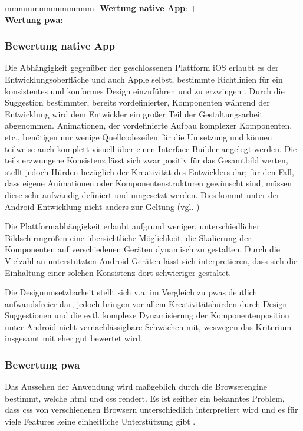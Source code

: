 \begin{tabbing}
	mmmmmmmmmmmmm				\= \kill
	\textbf{Wertung native App}: \> $+$ \\
	\textbf{Wertung \ac{pwa}}: \> $-$
\end{tabbing}

\subsubsection{Bewertung native App}
Die Abhängigkeit gegenüber der geschlossenen Plattform iOS erlaubt es der Entwicklungsoberfläche und auch Apple selbst, bestimmte Richtlinien für ein konsistentes und konformes Design einzuführen und zu erzwingen \cite{AppleDesign}. Durch die Suggestion bestimmter, bereits vordefinierter, Komponenten während der Entwicklung wird dem Entwickler ein großer Teil der Gestaltungsarbeit abgenommen. Animationen, der vordefinierte Aufbau komplexer Komponenten, etc., benötigen nur wenige Quellcodezeilen für die Umsetzung und können teilweise auch komplett visuell über einen Interface Builder angelegt werden. Die teils erzwungene Konsistenz lässt sich zwar positiv für das Gesamtbild werten, stellt jedoch Hürden bezüglich der Kreativität des Entwicklers dar; für den Fall, dass eigene Animationen oder Komponentenstrukturen gewünscht sind, müssen diese sehr aufwändig definiert und umgesetzt werden. Dies kommt unter der Android-Entwicklung nicht anders zur Geltung (vgl. \cite{AndroidDesign})

Die Plattformabhängigkeit erlaubt aufgrund weniger, unterschiedlicher Bildschirmgrößen eine übersichtliche Möglichkeit, die Skalierung der Komponenten auf verschiedenen Geräten dynamisch zu gestalten. Durch die Vielzahl an unterstützten Android-Geräten lässt sich interpretieren, dass sich die Einhaltung einer solchen Konsistenz dort schwieriger gestaltet.

Die Designumsetzbarkeit stellt sich v.a. im Vergleich zu \acp{pwa} deutlich aufwandsfreier dar, jedoch bringen vor allem Kreativitätshürden durch Design-Suggestionen und die evtl. komplexe Dynamisierung der Komponentenposition unter Android nicht vernachlässigbare Schwächen mit, weswegen das Kriterium insgesamt mit eher gut bewertet wird.

\subsubsection{Bewertung \ac{pwa}}
Das Aussehen der Anwendung wird maßgeblich durch die Browserengine bestimmt, welche \ac{html} und \ac{css} rendert. Es ist seither ein bekanntes Problem, dass \ac{css} von verschiedenen Browsern unterschiedlich interpretiert wird und es für viele Features keine einheitliche Unterstützung gibt \cite{MozillaHandlingCommonHTMLCSSProblems}.

